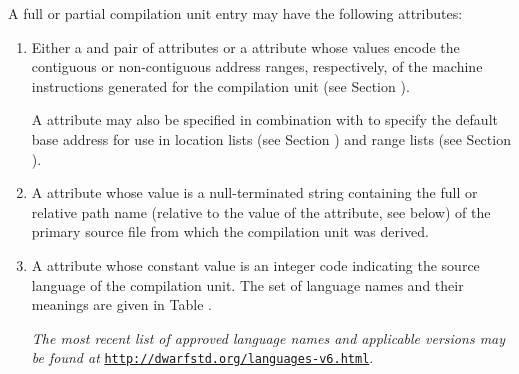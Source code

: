 A full or partial compilation unit entry 
may have the following attributes:
\begin{enumerate}[1. ]
\item Either a \DWATlowpc{} and 
\DWAThighpc{} pair of
attributes 
or 
a 
\DWATranges{} attribute
whose values encode 
the contiguous or 
non-contiguous address ranges, respectively,
of the machine instructions generated for the compilation
unit (see Section ).
  
A \DWATlowpc{} attribute 
may also be specified in combination 
with 
\DWATranges{} to specify the
default base address for use in 
location lists (see Section
) and range lists 
(see Section ).

\item \hypertarget{chap:DWATnamepathnameofcompilationsource}{}
A \DWATnameDEFN{} attribute 
whose value is a null-terminated string 
containing the full or relative path name 
(relative to the value of the \DWATcompdir{} attribute, 
see below) of the primary
source file from which the compilation unit was derived.

\item \hypertarget{chap:DWATlanguageprogramminglanguagename}{}
A 
\bb
\DWATlanguagenameDEFN{} 
\eb
attribute
whose constant value is an integer code 
indicating the source language of the compilation
unit. The set of language names and their meanings are given
in Table .

\bb
\textit{The most recent list of approved language names  
and applicable versions may be found at}  
\texttt{\url{http://dwarfstd.org/languages-v6.html}}. 
\eb


\end{enumerate}
